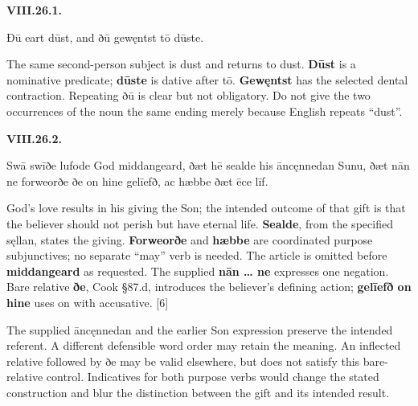 \par\begin{minipage}{\linewidth}\raggedright
\textbf{VIII.26.1.}

Ðū eart dūst, and ðū gewęntst tō dūste.

The same second-person subject is dust and returns to dust. \textbf{Dūst} is a nominative predicate; \textbf{dūste} is dative after tō. \textbf{Gewęntst} has the selected dental contraction. Repeating ðū is clear but not obligatory. Do not give the two occurrences of the noun the same ending merely because English repeats “dust”.

\end{minipage}\par\addvspace{4pt}

\par\begin{minipage}{\linewidth}\raggedright
\textbf{VIII.26.2.}

Swā swīðe lufode God middangeard, ðæt hē sealde his āncęnnedan Sunu, ðæt nān ne forweorðe ðe on hine gelīefð, ac hæbbe ðæt ēce līf.

God's love results in his giving the Son; the intended outcome of that gift is that the believer should not perish but have eternal life. \textbf{Sealde}, from the specified sęllan, states the giving. \textbf{Forweorðe} and \textbf{hæbbe} are coordinated purpose subjunctives; no separate “may” verb is needed. The article is omitted before \textbf{middangeard} as requested. The supplied \textbf{nān … ne} expresses one negation. Bare relative \textbf{ðe}, Cook §87.d, introduces the believer's defining action; \textbf{gelīefð on hine} uses on with accusative. [6]

The supplied āncęnnedan and the earlier Son expression preserve the intended referent. A different defensible word order may retain the meaning. An inflected relative followed by ðe may be valid elsewhere, but does not satisfy this bare-relative control. Indicatives for both purpose verbs would change the stated construction and blur the distinction between the gift and its intended result.

\end{minipage}\par\addvspace{4pt}

